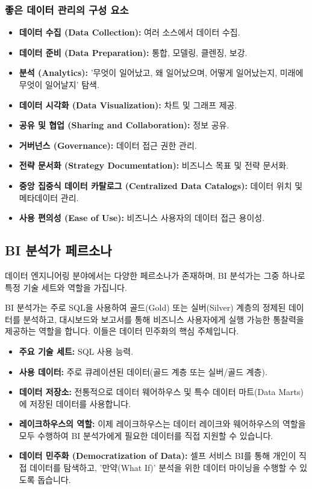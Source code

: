 \documentclass[11pt,a4paper]{article}
\begin{document}
\subsubsection{좋은 데이터 관리의 구성 요소}
\begin{itemize}
    \item \textbf{데이터 수집 (Data Collection):} 여러 소스에서 데이터 수집.
    \item \textbf{데이터 준비 (Data Preparation):} 통합, 모델링, 클렌징, 보강.
    \item \textbf{분석 (Analytics):} '무엇이 일어났고, 왜 일어났으며, 어떻게 일어났는지, 미래에 무엇이 일어날지' 탐색.
    \item \textbf{데이터 시각화 (Data Visualization):} 차트 및 그래프 제공.
    \item \textbf{공유 및 협업 (Sharing and Collaboration):} 정보 공유.
    \item \textbf{거버넌스 (Governance):} 데이터 접근 권한 관리.
    \item \textbf{전략 문서화 (Strategy Documentation):} 비즈니스 목표 및 전략 문서화.
    \item \textbf{중앙 집중식 데이터 카탈로그 (Centralized Data Catalogs):} 데이터 위치 및 메타데이터 관리.
    \item \textbf{사용 편의성 (Ease of Use):} 비즈니스 사용자의 데이터 접근 용이성.
\end{itemize}

\subsection{BI 분석가 페르소나}
데이터 엔지니어링 분야에서는 다양한 페르소나가 존재하며, BI 분석가는 그중 하나로 특정 기술 세트와 역할을 가집니다.

\begin{tcolorbox}[mybox={핵심 요약: 비즈니스 통찰력의 전달자}]
BI 분석가는 주로 SQL을 사용하여 골드(Gold) 또는 실버(Silver) 계층의 정제된 데이터를 분석하고, 대시보드와 보고서를 통해 비즈니스 사용자에게 실행 가능한 통찰력을 제공하는 역할을 합니다. 이들은 데이터 민주화의 핵심 주체입니다.
\end{tcolorbox}

\begin{itemize}
    \item \textbf{주요 기술 세트:} SQL 사용 능력.
    \item \textbf{사용 데이터:} 주로 큐레이션된 데이터(골드 계층 또는 실버/골드 계층).
    \item \textbf{데이터 저장소:} 전통적으로 데이터 웨어하우스 및 특수 데이터 마트(Data Marts)에 저장된 데이터를 사용합니다.
    \item \textbf{레이크하우스의 역할:} 이제 레이크하우스는 데이터 레이크와 웨어하우스의 역할을 모두 수행하여 BI 분석가에게 필요한 데이터를 직접 지원할 수 있습니다.
    \item \textbf{데이터 민주화 (Democratization of Data):} 셀프 서비스 BI를 통해 개인이 직접 데이터를 탐색하고, '만약(What If)' 분석을 위한 데이터 마이닝을 수행할 수 있도록 돕습니다.
\end{itemize}
\end{document}
